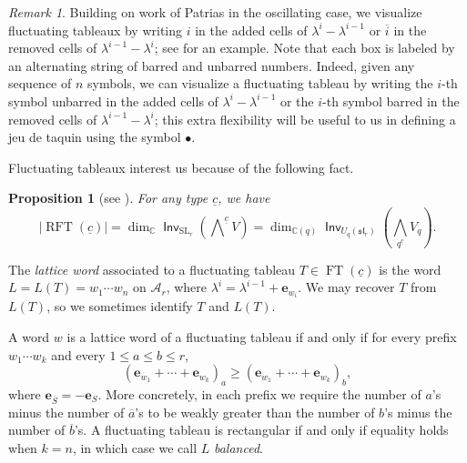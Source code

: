 \documentclass{amsart}
\newtheorem{proposition}[theorem]{Proposition}
\theoremstyle{definition}
\theoremstyle{remark}
\newtheorem{remark}[theorem]{Remark}
\numberwithin{equation}{section}
\DeclareMathOperator{\ft}{FT}
\DeclareMathOperator{\rft}{RFT}
\DeclareMathOperator{\SL}{SL}
\newcommand{\fsl}{\mathfrak{sl}}
\DeclareMathOperator{\Inv}{\mathsf{Inv}}
\begin{document}
\begin{remark}\label{rem:drawing_tabs}
Building on work of Patrias \cite{Patrias} in the oscillating case, we visualize fluctuating tableaux by writing $i$ in the added cells of $\lambda^i - \lambda^{i-1}$ or $\overline{i}$ in the removed cells of $\lambda^{i-1} - \lambda^i$; see  for an example.
Note that each box is labeled by an alternating string of barred and unbarred numbers. Indeed, given any sequence of $n$ symbols, we can visualize a fluctuating tableau by writing the $i$-th symbol unbarred in the added cells of $\lambda^i - \lambda^{i-1}$ or the $i$-th symbol barred in the removed cells of $\lambda^{i-1} - \lambda^i$; this extra flexibility will be useful to us in defining a jeu de taquin using the symbol $\bullet$.
\end{remark}

Fluctuating tableaux interest us because of the following fact.

\begin{proposition}[{see \cite[Prop.~2.10]{fluctuating-paper}}]
\label{prop:fluc-tab-give-dimension}
For any type $\underline{c}$, we have
\begin{equation}\label{eq:fluc-tab-give-dimension}
  |\rft(\underline{c})| = \dim_{\mathbb{C}} \Inv_{\SL_r}(\bigwedge\nolimits^{\underline{c}} V) = \dim_{\mathbb{C}(q)} \Inv_{U_q(\fsl_r)}(\bigwedge_q\nolimits^{\underline{c}} V_q).
\end{equation}
\end{proposition}

The \emph{lattice word} associated to a fluctuating tableau $T \in \ft(\underline{c})$ is the word $L = L(T) = w_1 \cdots w_n$ on 
$\mathcal{A}_r$, 
  where $\lambda^i = \lambda^{i-1} + \mathbf{e}_{w_i}$.
 We may recover $T$ from $L(T)$, so we sometimes identify $T$ and $L(T)$. 

A word $w$ is a lattice word of a fluctuating tableau if and only if for every prefix $w_1 \cdots w_k$ and every $1 \leq a \leq b \leq r$,
\begin{equation}\label{eq:lattice_inequalities}
  (\mathbf{e}_{w_1} + \cdots + \mathbf{e}_{w_k})_a \geq (\mathbf{e}_{w_1} + \cdots + \mathbf{e}_{w_k})_b,
\end{equation}
where $\mathbf{e}_{\overline{S}} = -\mathbf{e}_S$. More concretely, in each prefix we require the number of $a$'s minus the number of $\overline{a}$'s to be weakly greater than the number of $b$'s minus the number of $\overline{b}$'s. A fluctuating tableau is rectangular if and only if equality holds when $k=n$, in which case we call $L$ \emph{balanced}.
\end{document}
